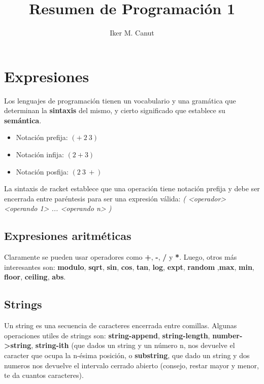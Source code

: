 \documentclass[11pt,a4paper]{article}
\begin{document}
\title{Resumen de Programación 1}
\author{Iker M. Canut}
\maketitle
\newpage

\tableofcontents
\newpage

\section{Expresiones}
Los lenguajes de programación tienen un vocabulario y una gramática que determinan la \textbf{sintaxis} del mismo, y cierto significado que establece su \textbf{semántica}.
\begin{multicols}{3}
\begin{itemize}
\item Notación prefija: $(+\ 2\ 3)$
\item Notación infija:  $(2 + 3)$ 
\item Notación posfija: $(2\ 3\ +)$ 
\end{itemize}
\end{multicols}
La sintaxis de racket establece que una operación tiene notación prefija y debe ser encerrada entre paréntesis para ser una expresión válida: \textit{( <operador> <operando 1> ... <operando n> )}

\subsection{Expresiones aritméticas}
Claramente se pueden usar operadores como \textbf{+}, \textbf{-}, \textbf{/} y \textbf{*}. Luego, otros más interesantes son: \textbf{modulo}, \textbf{sqrt}, \textbf{sin}, \textbf{cos}, \textbf{tan}, \textbf{log}, \textbf{expt}, \textbf{random} ,\textbf{max}, \textbf{min}, \textbf{floor}, \textbf{ceiling}, \textbf{abs}.

\subsection{Strings}
Un string es una secuencia de caracteres encerrada entre comillas. Algunas operaciones utiles de strings son: \textbf{string-append}, \textbf{string-length}, \textbf{number->string}, \textbf{string-ith} (que dados un string y un n\'umero n, nos devuelve el caracter que ocupa la n-ésima posición, o \textbf{substring}, que dado un string y dos numeros nos devuelve el intervalo cerrado abierto (consejo, restar mayor y menor, te da cuantos caracteres).
\end{document}
